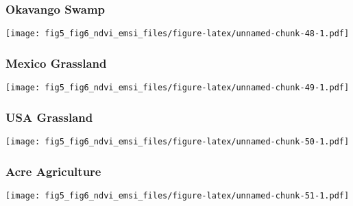\documentclass[
]{article}
\begin{document}
\hypertarget{htmlwidget-4b998d149a45084297db}{}
\begin{plotly}

\end{plotly}

\hypertarget{okavango-swamp-3}{%
\subsubsection{Okavango Swamp}\label{okavango-swamp-3}}

\texttt{[image: fig5\_fig6\_ndvi\_emsi\_files/figure-latex/unnamed-chunk-48-1.pdf]}

\hypertarget{htmlwidget-68834d32986c6d42fed3}{}
\begin{plotly}

\end{plotly}

\hypertarget{mexico-grassland-2}{%
\subsubsection{Mexico Grassland}\label{mexico-grassland-2}}

\texttt{[image: fig5\_fig6\_ndvi\_emsi\_files/figure-latex/unnamed-chunk-49-1.pdf]}

\hypertarget{htmlwidget-f99b2439727905eaee73}{}
\begin{plotly}

\end{plotly}

\hypertarget{usa-grassland-2}{%
\subsubsection{USA Grassland}\label{usa-grassland-2}}

\texttt{[image: fig5\_fig6\_ndvi\_emsi\_files/figure-latex/unnamed-chunk-50-1.pdf]}

\hypertarget{htmlwidget-6070a9b732cc7f101d5b}{}
\begin{plotly}

\end{plotly}

\hypertarget{acre-agriculture-3}{%
\subsubsection{Acre Agriculture}\label{acre-agriculture-3}}

\texttt{[image: fig5\_fig6\_ndvi\_emsi\_files/figure-latex/unnamed-chunk-51-1.pdf]}
\end{document}
